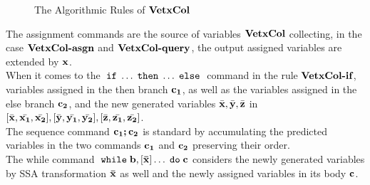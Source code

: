 \documentclass[a4paper,11pt]{article}
\begin{document}
\begin{figure}
 \caption{The Algorithmic Rules of $\bf{VetxCol}$ }
    \label{fig:var_col}
\end{figure}
%
%
The assignment commands are the source of variables $\bf{VetxCol}$ collecting, 
	in the case $\textbf{\bf{VetxCol}-asgn}$ and $\textbf{\bf{VetxCol}-query}$, 
	the output assigned variables are extended by ${\boldsymbol{\mathbf{x}}}$. 
\\
	When it comes to the $\;\mathtt{if}\; \ldots \mathtt{\;then\;} \ldots \mathtt{\;else\;}$ command in the rule $\textbf{\bf{VetxCol}-if}$, variables assigned in the then branch ${\boldsymbol{\mathbf{c_1}}}$, as well as the variables assigned in the else branch ${\boldsymbol{\mathbf{c_2}}}$, and the new generated variables $\bar{{\boldsymbol{\mathbf{x}}}},\bar{{\boldsymbol{\mathbf{y}}}},\bar{{\boldsymbol{\mathbf{z}}}}$ in $ [ \bar{{\boldsymbol{\mathbf{x}}}}, \bar{{\boldsymbol{\mathbf{x_1}}}}, \bar{{\boldsymbol{\mathbf{x_2}}}}] ,[ \bar{{\boldsymbol{\mathbf{y}}}}, \bar{{\boldsymbol{\mathbf{y_1}}}}, \bar{{\boldsymbol{\mathbf{y_2}}}}],[ \bar{{\boldsymbol{\mathbf{z}}}}, \bar{{\boldsymbol{\mathbf{z_1}}}}, \bar{{\boldsymbol{\mathbf{z_2}}}}]$.
\\ 
	The sequence command ${\boldsymbol{\mathbf{c_1;c_2}}}$ is standard by accumulating the predicted variables in the two commands ${\boldsymbol{\mathbf{c_1}}}$ and ${\boldsymbol{\mathbf{c_2}}}$ preserving their order. 
\\
	The while command $\;\mathtt{while}\; {\boldsymbol{\mathbf{b}}}, [{\boldsymbol{\mathbf{\bar{x}}}}] \ldots \;\mathtt{do}\; {\boldsymbol{\mathbf{c}}}$ considers the newly generated variables by SSA transformation ${\boldsymbol{\mathbf{\bar{x}}}}$
	as well and the newly assigned variables in its body ${\boldsymbol{\mathbf{c}}}$.
\end{document}
